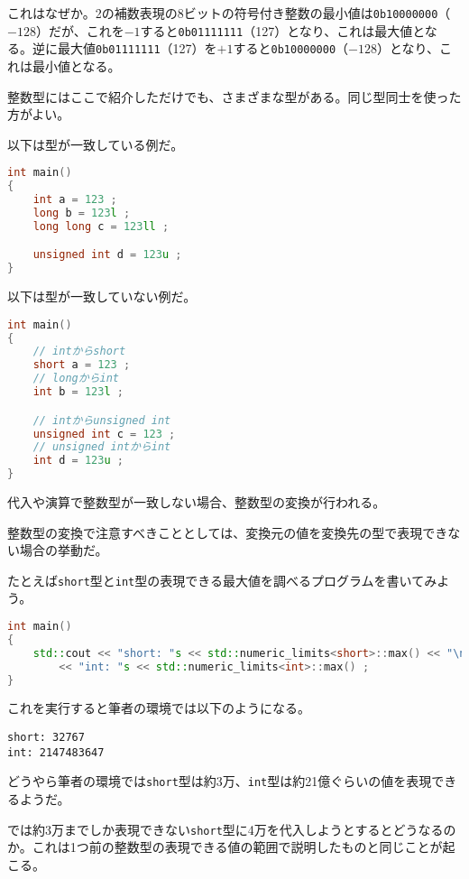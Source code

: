 これはなぜか。2の補数表現の8ビットの符号付き整数の最小値は\texttt{0b10000000}（\(-128\)）だが、これを\(-1\)すると\texttt{0b01111111}（127）となり、これは最大値となる。逆に最大値\texttt{0b01111111}（127）を\(+1\)すると\texttt{0b10000000}（\(-128\)）となり、これは最小値となる。

\clearpage
{}

整数型にはここで紹介しただけでも、さまざまな型がある。同じ型同士を使った方がよい。

以下は型が一致している例だ。

\begin{lstlisting}[language={C++}]
int main()
{
    int a = 123 ;
    long b = 123l ;
    long long c = 123ll ;

    unsigned int d = 123u ; 
}
\end{lstlisting}

以下は型が一致していない例だ。

\begin{lstlisting}[language={C++}]
int main()
{
    // intからshort
    short a = 123 ;
    // longからint
    int b = 123l ;

    // intからunsigned int
    unsigned int c = 123 ;
    // unsigned intからint
    int d = 123u ;
}
\end{lstlisting}

代入や演算で整数型が一致しない場合、整数型の変換が行われる。

整数型の変換で注意すべきこととしては、変換元の値を変換先の型で表現できない場合の挙動だ。

たとえば\texttt{short}型と\texttt{int}型の表現できる最大値を調べるプログラムを書いてみよう。

\begin{lstlisting}[language={C++}]
int main()
{
    std::cout << "short: "s << std::numeric_limits<short>::max() << "\n"s
        << "int: "s << std::numeric_limits<int>::max() ;
}
\end{lstlisting}

これを実行すると筆者の環境では以下のようになる。

\begin{lstlisting}[style=terminal]
short: 32767
int: 2147483647
\end{lstlisting}

どうやら筆者の環境では\texttt{short}型は約3万、\texttt{int}型は約21億ぐらいの値を表現できるようだ。

では約3万までしか表現できない\texttt{short}型に4万を代入しようとするとどうなるのか。これは1つ前の整数型の表現できる値の範囲で説明したものと同じことが起こる。

